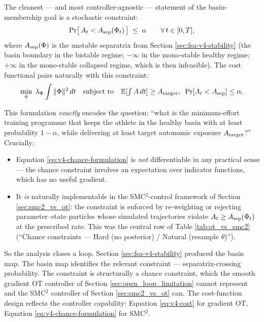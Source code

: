 The cleanest --- and most controller-agnostic --- statement of the basin-membership goal is a stochastic constraint:
\begin{equation}
\Pr\!\big[\,A_t < A_{\rm sep}(\Phi_t)\,\big] \;\le\; \alpha \qquad \forall\, t \in [0, T],
\label{eq:chance-constraint}
\end{equation}
where $A_{\rm sep}(\Phi)$ is the unstable separatrix from Section \ref{sec:fsa-v4-stability} (the basin boundary in the bistable regime; $-\infty$ in the mono-stable healthy regime; $+\infty$ in the mono-stable collapsed regime, which is then infeasible). The cost functional pairs naturally with this constraint:
\begin{equation}
\min_\theta \; \lambda_\Phi \int \|\Phi\|^2\, dt \quad \text{subject to} \quad \mathbb{E}[\textstyle\int A\, dt] \ge A_{\rm target}, \;\;\Pr[A_t < A_{\rm sep}] \le \alpha.
\label{eq:v4-chance-formulation}
\end{equation}

This formulation \emph{exactly} encodes the question: ``what is the minimum-effort training programme that keeps the athlete in the healthy basin with at least probability $1 - \alpha$, while delivering at least target autonomic exposure $A_{\rm target}$?'' Crucially:
\begin{itemize}
  \item Equation \ref{eq:v4-chance-formulation} is \emph{not} differentiable in any practical sense --- the chance constraint involves an expectation over indicator functions, which has no useful gradient.
  \item It \emph{is} naturally implementable in the SMC$^2$-control framework of Section \ref{sec:smc2_vs_ot}: the constraint is enforced by re-weighting or rejecting parameter--state particles whose simulated trajectories violate $A_t \ge A_{\rm sep}(\Phi_t)$ at the prescribed rate. This was the central row of Table \ref{tab:ot_vs_smc2} (``Chance constraints --- Hard (no posterior) / Natural (resample $\theta$)'').
\end{itemize}

So the analysis closes a loop. Section \ref{sec:fsa-v4-stability} produced the basin map. The basin map identifies the relevant constraint --- separatrix-crossing probability. The constraint is structurally a chance constraint, which the smooth gradient OT controller of Section \ref{sec:open_loop_limitation} cannot represent and the SMC$^2$ controller of Section \ref{sec:smc2_vs_ot} can. The cost-function design reflects the controller capability: Equation \ref{eq:v4-cost} for gradient OT, Equation \ref{eq:v4-chance-formulation} for SMC$^2$.

